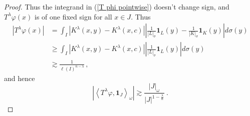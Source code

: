 \documentclass{amsart}%
\theoremstyle{plain}
\numberwithin{equation}{section}
\begin{document}
\begin{proof}
Thus the integrand in (\ref{T phi pointwise}) doesn't change sign, and 
$T^{\lambda}\varphi\left(  x\right)  $ is of one fixed sign for all $x\in J$.
Thus 
\begin{align}
\left\vert T^{\lambda}\varphi\left(  x\right)  \right\vert  &  =\int
_{I}\left\vert K^{\lambda}\left(  x,y\right)  -K^{\lambda}\left(  x,c\right)
\right\vert \left\vert \frac{1}{\left\vert L\right\vert _{\sigma}}%
\mathbf{1}_{L}\left(  y\right)  -\frac{1}{\left\vert K\right\vert _{\sigma}%
}\mathbf{1}_{K}\left(  y\right)  \right\vert d\sigma\left(  y\right)
\label{eq:init_nondegen}\\
&  \geq\int_{I}\left\vert K^{\lambda}\left(  x,y\right)  -K^{\lambda}\left(
x,c\right)  \right\vert \left\vert \frac{1}{\left\vert L\right\vert _{\sigma}%
}\mathbf{1}_{L}\left(  y\right)  \right\vert d\sigma\left(  y\right)
\nonumber\\
&  \gtrsim\frac{1}{\ell\left(  I\right)  ^{n-\lambda}}\,,\nonumber
\end{align}
and hence
\[
\left\vert \left\langle T^{\lambda}\varphi,\mathbf{1}_{J}\right\rangle
_{\omega}\right\vert \gtrsim\frac{\left\vert J\right\vert _{\omega}%
}{\left\vert J\right\vert ^{1-\frac{\lambda}{n}}}\ .
\]



\end{proof}
\end{document}
